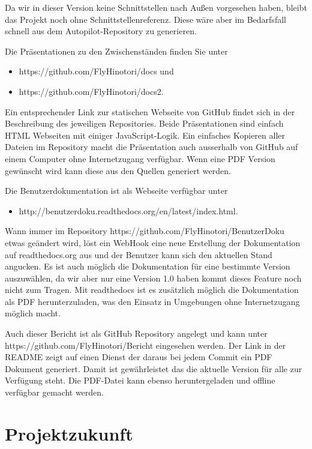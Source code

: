 \documentclass[12pt]{article}
\begin{document}
Da wir in dieser Version keine Schnittstellen nach Außen vorgesehen haben, bleibt das Projekt noch ohne Schnittstellenreferenz. Diese wäre aber im Bedarfsfall schnell aus dem Autopilot-Repository zu generieren.
\newline

Die Präsentationen zu den Zwischenständen finden Sie unter
\begin{itemize}
  \item https://github.com/FlyHinotori/docs und
  \item https://github.com/FlyHinotori/docs2.
\end{itemize}
Ein entsprechender Link zur statischen Webseite von GitHub findet sich in der Beschreibung des jeweiligen Repositories. Beide Präsentationen sind einfach HTML Webseiten mit einiger JavaScript-Logik. Ein einfaches Kopieren aller Dateien im Repository macht die Präsentation auch ausserhalb von GitHub auf einem Computer ohne Internetzugang verfügbar. Wenn eine PDF Version gewünscht wird kann diese aus den Quellen generiert werden.
\newline

Die Benutzerdokumentation ist als Webseite verfügbar unter
\begin{itemize}
  \item http://benutzerdoku.readthedocs.org/en/latest/index.html.
\end{itemize}
Wann immer im Repository https://github.com/FlyHinotori/BenutzerDoku etwas geändert wird, löst ein WebHook eine neue Erstellung der Dokumentation auf readthedocs.org aus und der Benutzer kann sich den aktuellen Stand angucken. Es ist auch möglich die Dokumentation für eine bestimmte Version auszuwählen, da wir aber nur eine Version 1.0 haben kommt dieses Feature noch nicht zum Tragen. Mit readthedocs ist es zusätzlich möglich die Dokumentation als PDF herunterzuladen, was den Einsatz in Umgebungen ohne Internetzugang möglich macht.
\newline

Auch dieser Bericht ist als GitHub Repository angelegt und kann unter https://github.com/FlyHinotori/Bericht eingesehen werden. Der Link in der README zeigt auf einen Dienst der daraus bei jedem Commit ein PDF Dokument generiert. Damit ist gewährleistet das die aktuelle Version für alle zur Verfügung steht. Die PDF-Datei kann ebenso heruntergeladen und offline verfügbar gemacht werden.

\newpage
\section{Projektzukunft}
\end{document}
